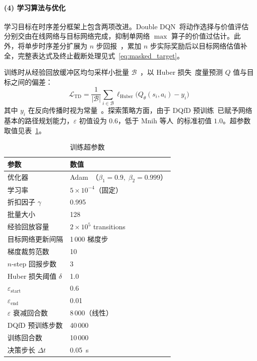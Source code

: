 \documentclass{iopjournal}
\begin{document}
\paragraph{(4) 学习算法与优化}\label{sec:ddqn}

学习目标在时序差分框架上包含两项改进。Double DQN~\cite{van2016deep}将动作选择与价值评估分别交由在线网络与目标网络完成，抑制单网络 $\max$ 算子的价值过估计。此外，将单步时序差分扩展为 $n$ 步回报~\cite{sutton1988learning,sutton2018reinforcement}，累加 $n$ 步实际奖励后以目标网络估值补全，完整表达式及终止截断处理见式~\eqref{eq:masked_target}。

训练时从经验回放缓冲区均匀采样小批量 $\mathcal{B}$~\cite{mnih2015human}，以 Huber 损失~\cite{huber1964robust}度量预测 $Q$ 值与目标之间的偏差：
\begin{equation}\label{eq:huber}
  \mathcal{L}_{\mathrm{TD}} = \frac{1}{|\mathcal{B}|}
    \sum_{i\in\mathcal{B}} \ell_{\mathrm{Huber}}\!\bigl(Q_{\theta}(s_i,a_i)-y_i\bigr)
\end{equation}
其中 $y_i$ 在反向传播时视为常量~\cite{mnih2015human}。探索策略方面，由于 DQfD 预训练~\cite{hester2018deep}已赋予网络基本的路径规划能力，$\varepsilon$ 初值设为 $0.6$，低于 Mnih 等人~\cite{mnih2015human}的标准初值 $1.0$。超参数取值见表~\ref{tab:train_params}。

\begin{table}[!htbp]
\centering
\caption{训练超参数}
\label{tab:train_params}
\begin{tabular}{ll}
\toprule
参数 & 数值 \\
\midrule
优化器                    & Adam~\cite{kingma2015adam}（$\beta_1\!=\!0.9,\;\beta_2\!=\!0.999$） \\
学习率                    & $5\times10^{-4}$（固定） \\
折扣因子 $\gamma$         & 0.995 \\
批量大小                  & 128 \\
经验回放容量              & $2\times10^{5}$ transitions \\
目标网络更新间隔          & 1\,000 梯度步 \\
梯度裁剪范数              & 10 \\
$n$-step 回报步数         & 3 \\
Huber 损失阈值 $\delta$   & 1.0 \\
$\varepsilon_{\mathrm{start}}$  & 0.6 \\
$\varepsilon_{\mathrm{end}}$    & 0.01 \\
$\varepsilon$ 衰减回合数        & 8\,000（线性） \\
DQfD 预训练步数           & 40\,000 \\
训练回合数                & 10\,000 \\
\midrule
决策步长 $\Delta t$       & \SI{0.05}{s} \\
\bottomrule
\end{tabular}
\end{table}
\end{document}
